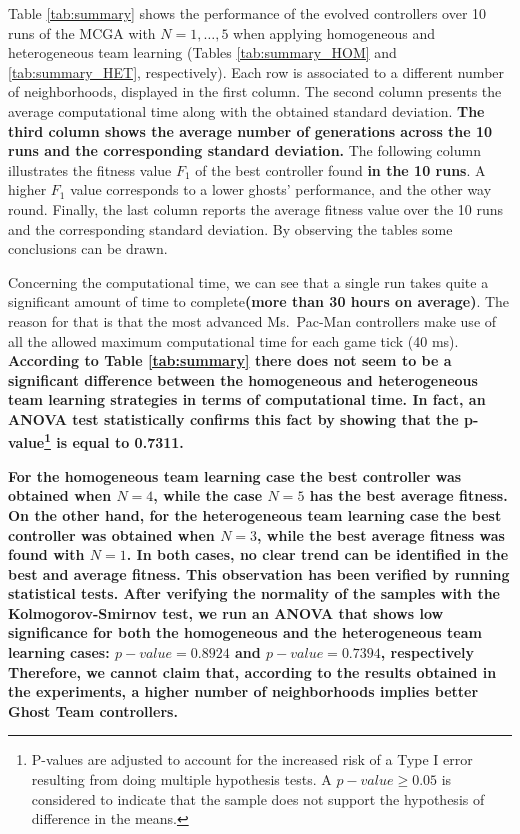 \documentclass[journal]{IEEEtran}
\begin{document}
Table \ref{tab:summary} shows the performance of the evolved controllers over 10 runs of the MCGA with $N=1,\ldots,5$ when applying homogeneous and heterogeneous team learning (Tables \ref{tab:summary_HOM} and \ref{tab:summary_HET}, respectively). Each row is associated to a different number of neighborhoods, displayed in the first column. The second column presents the average computational time along with the obtained standard deviation. \textbf{The third column shows the average number of generations across the 10 runs and the corresponding standard deviation.} The following column illustrates the fitness value $F_1$ of the best controller found \textbf{in the 10 runs}. A higher $F_1$ value corresponds to a lower ghosts' performance, and the other way round. Finally, the last column reports the average fitness value over the 10 runs and the corresponding standard deviation. By observing the tables some conclusions can be drawn.

Concerning the computational time, we can see that a single run takes
quite a significant amount of time to complete\textbf{(more than 30 hours
on average)}. The reason for that is that the most advanced
Ms.\  Pac-Man controllers make use of all the allowed maximum
computational time for each game tick (40 ms). \textbf{According to Table \ref{tab:summary} there does not seem to be a significant difference between the homogeneous and heterogeneous team learning strategies in terms of computational time. In fact, an ANOVA test statistically confirms this fact by showing that the p-value\footnote{P-values are adjusted to account for the increased risk of a Type I error resulting from doing multiple hypothesis tests. A $p-value\geq0.05$ is considered to indicate that the sample does not support the hypothesis of difference in the means.} is equal to 0.7311.}

\textbf{For the homogeneous team learning case the best controller was obtained
when $N=4$, while the case $N=5$ has the best average fitness. On the other hand, for the heterogeneous team learning case the best controller was obtained when $N=3$, while the best average fitness was found with $N=1$. In both cases, no clear trend can be identified in the best and average fitness. This observation has been verified by running statistical tests. After verifying the normality of the samples with the Kolmogorov-Smirnov test, we run an ANOVA that shows low significance for both the homogeneous and the heterogeneous team learning cases: $p-value=0.8924$ and $p-value=0.7394$, respectively Therefore, we cannot claim that, according to the results obtained in the experiments, a higher number of neighborhoods implies better Ghost Team controllers.}
\end{document}
